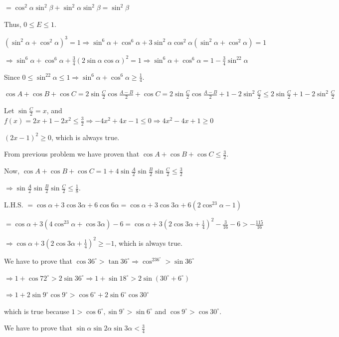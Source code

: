   $= \cos^2\alpha\sin^2\beta + \sin^2\alpha\sin^2\beta = \sin^2\beta$

  Thus, $0 \leq E \leq 1$.
\item $\left(\sin^2\alpha + \cos^2\alpha\right)^3 = 1 \Rightarrow \sin^6\alpha + \cos^6\alpha +
  3\sin^2\alpha\cos^2\alpha(\sin^2\alpha + \cos^2\alpha) = 1$

  $\Rightarrow \sin^6\alpha + \cos^6\alpha + \frac{3}{4}(2\sin\alpha\cos\alpha)^2 = 1 \Rightarrow
  \sin^6\alpha + \cos^6\alpha = 1 - \frac{3}{4}\sin^22\alpha$

  Since $0 \leq \sin^22\alpha \leq 1\Rightarrow \sin^6\alpha + \cos^6\alpha \geq \frac{1}{4}$.
\item $\cos A + \cos B + \cos C = 2\sin\frac{C}{2}\cos\frac{A - B}{2} + \cos C = 2\sin\frac{C}{2}\cos\frac{A
  - B}{2} + 1 - 2\sin^2\frac{C}{2}\leq 2\sin\frac{C}{2} + 1 - 2\sin^2\frac{C}{2}$

  Let $\sin\frac{C}{2} = x$, and $f(x) = 2x + 1 - 2x^2\leq \frac{3}{2}\Rightarrow -4x^2 + 4x - 1 \leq 0
  \Rightarrow 4x^2 - 4x + 1\geq 0$

  $(2x - 1)^2\geq 0$, which is always true.
\item From previous problem we have proven that $\cos A + \cos B + \cos C\leq \frac{3}{2}$.

  Now, $\cos A + \cos B + \cos C = 1 + 4\sin\frac{A}{2}\sin\frac{B}{2}\sin\frac{C}{2}\leq \frac{3}{2}$

  $\Rightarrow \sin\frac{A}{2}\sin\frac{B}{2}\sin\frac{C}{2}\leq \frac{1}{8}$.
\item L.H.S. $= \cos\alpha + 3\cos3\alpha + 6\cos6\alpha = \cos\alpha + 3\cos3\alpha + 6\left(2\cos^23\alpha
  - 1\right)$

  $= \cos\alpha + 3\left(4\cos^23\alpha + \cos3\alpha\right) - 6 = \cos\alpha + 3\left(2\cos3\alpha +
  \frac{1}{4}\right)^2 - \frac{3}{16} - 6 > -\frac{115}{16}$

  $\Rightarrow \cos\alpha + 3\left(2\cos3\alpha + \frac{1}{4}\right)^2\geq -1$, which is always true.
\item We have to prove that $\cos36^\circ > \tan36^\circ \Rightarrow \cos^236^\circ > \sin36^\circ$

  $\Rightarrow 1 + \cos72^\circ > 2\sin36^\circ \Rightarrow 1 + \sin18^\circ > 2\sin(30^\circ + 6^\circ)$

  $\Rightarrow 1 + 2\sin9^\circ\cos9^\circ > \cos6^\circ + 2\sin6^\circ\cos30^\circ$

  which is true because $1 > \cos6^\circ, \sin9^\circ > \sin6^\circ$ and $\cos9^\circ > \cos30^\circ$.
\item We have to prove that $\sin\alpha\sin2\alpha\sin3\alpha < \frac{3}{4}$

